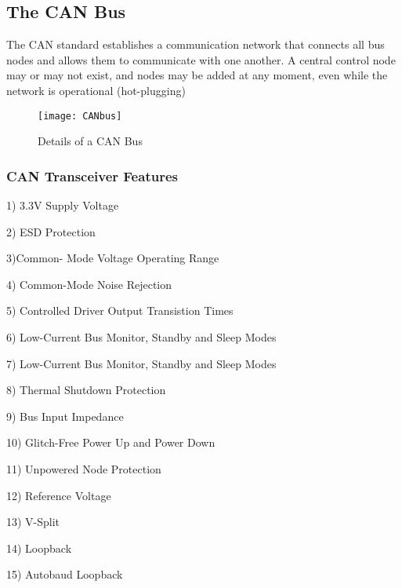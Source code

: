\subsection{The CAN Bus}

The CAN standard establishes a communication network that connects all bus nodes and allows them to communicate with one another. A central control node may or may not exist, and nodes may be added at any moment, even while the network is operational (hot-plugging)

\begin{figure}[h]
    \centering
    \texttt{[image: CANbus]}
    \caption{ Details of a CAN Bus \cite{b5}}
    \label{fig:CANbus}
\end{figure}



\subsubsection{CAN Transceiver Features}



1) 3.3V Supply Voltage

2) ESD Protection

3)Common- Mode Voltage Operating Range

4) Common-Mode Noise Rejection

5) Controlled Driver Output Transistion Times

6) Low-Current Bus Monitor, Standby and Sleep Modes

7) Low-Current Bus Monitor, Standby and Sleep Modes

8) Thermal Shutdown Protection

9)  Bus Input Impedance

10)  Glitch-Free Power Up and Power Down

11)  Unpowered Node Protection

12) Reference Voltage

13) V-Split

14) Loopback

15) Autobaud Loopback





 